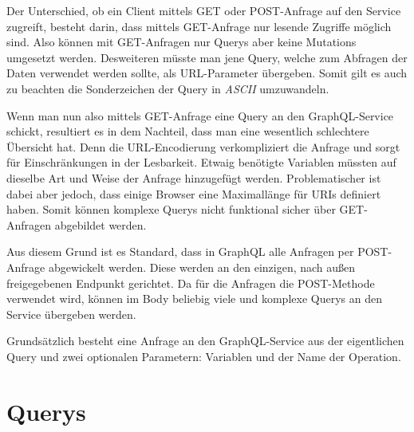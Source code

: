 Der Unterschied, ob ein Client mittels GET oder POST-Anfrage auf den Service zugreift, besteht darin, dass mittels GET-Anfrage nur lesende Zugriffe möglich sind.
Also können mit GET-Anfragen nur Querys aber keine Mutations umgesetzt werden.
Desweiteren müsste man jene Query, welche zum Abfragen der Daten verwendet werden sollte, als URL-Parameter übergeben.
Somit gilt es auch zu beachten die Sonderzeichen der Query in \textit{ASCII} umzuwandeln.
\newline

Wenn man nun also mittels GET-Anfrage eine Query an den GraphQL-Service schickt, resultiert es in dem Nachteil, dass man eine wesentlich schlechtere Übersicht hat. 
Denn die URL-Encodierung verkompliziert die Anfrage und sorgt für Einschränkungen in der Lesbarkeit.
Etwaig benötigte Variablen müssten auf dieselbe Art und Weise der Anfrage hinzugefügt werden.
Problematischer ist dabei aber jedoch, dass einige Browser eine Maximallänge für URIs definiert haben.
Somit können komplexe Querys nicht funktional sicher über GET-Anfragen abgebildet werden.
\newline

Aus diesem Grund ist es Standard, dass in GraphQL alle Anfragen per POST-Anfrage abgewickelt werden.
Diese werden an den einzigen, nach außen freigegebenen Endpunkt gerichtet.
Da für die Anfragen die POST-Methode verwendet wird, können im Body beliebig viele und komplexe Querys an den Service übergeben werden.
\newline

Grundsätzlich besteht eine Anfrage an den GraphQL-Service aus der eigentlichen Query und zwei optionalen Parametern: Variablen und der Name der Operation.




\section{Querys}

